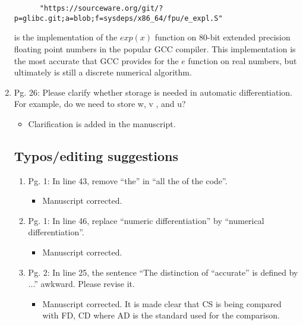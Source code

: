 \documentclass{article}
\begin{document}
\begin{enumerate}
{\begin{itemize}
      \begin{verbatim}
      "https://sourceware.org/git/?p=glibc.git;a=blob;f=sysdeps/x86_64/fpu/e_expl.S"
      \end{verbatim}

      is the implementation of the $exp(x)$ function on 80-bit extended
      precision floating point numbers in the popular GCC compiler. This
      implementation is the most accurate that GCC provides for the $e$
      function on real numbers, but ultimately is still a discrete numerical
      algorithm.

  \end{itemize}}

  \item
Pg. 26: Please clarify whether storage is needed in automatic differentiation. For
example, do we need to store w, v , and u?

{\color{red}  
\begin{itemize}
     \item
      Clarification is added in the manuscript.  
  \end{itemize}}

\subsection*{Typos/editing suggestions}
\begin{enumerate}

\item Pg. 1: In line 43, remove “the” in “all the of the code”.

{\color{red}  
\begin{itemize}
     \item
      Manuscript corrected.
  \end{itemize}}

 \item Pg. 1: In line 46, replace “numeric differentiation” by “numerical differentiation”.

{\color{red}  
\begin{itemize}
     \item
      Manuscript corrected.
  \end{itemize}}

 \item Pg. 2: In line 25, the sentence “The distinction of “accurate” is deﬁned by ...”
awkward. Please revise it.

{\color{red}  
\begin{itemize}
     \item
      Manuscript corrected. It is made clear that CS is being compared with FD, CD where AD is the standard used for the comparison.
  \end{itemize}}


\end{enumerate}
\end{enumerate}
\end{document}
